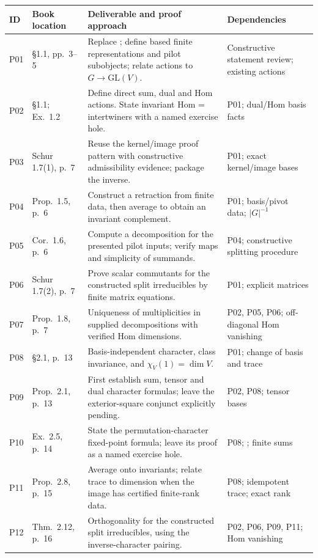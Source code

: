 \documentclass[11pt,a4paper]{article}
\newcommand{\code}[1]{\texttt{\detokenize{#1}}}
\begin{document}
{\small
\begin{tabularx}{\linewidth}{@{}P{10mm}P{31mm}YP{27mm}@{}}
\toprule
ID & Book location & Deliverable and proof approach & Dependencies \\
\midrule
P01 & \S1.1, pp.\ 3--5 & Replace \code{IsIrreducible}; define based finite representations and pilot subobjects; relate actions to $G\to\mathrm{GL}(V)$. & Constructive statement review; existing actions \\
P02 & \S1.1; Ex.\ 1.2 & Define direct sum, dual and Hom actions. State invariant Hom = intertwiners with a named exercise hole. & P01; dual/Hom basis facts \\
P03 & Schur 1.7(1), p.\ 7 & Reuse the kernel/image proof pattern with constructive admissibility evidence; package the inverse. & P01; exact kernel/image bases \\
P04 & Prop.\ 1.5, p.\ 6 & Construct a retraction from finite data, then average to obtain an invariant complement. & P01; basis/pivot data; $|G|^{-1}$ \\
P05 & Cor.\ 1.6, p.\ 6 & Compute a decomposition for the presented pilot inputs; verify maps and simplicity of summands. & P04; constructive splitting procedure \\
P06 & Schur 1.7(2), p.\ 7 & Prove scalar commutants for the constructed split irreducibles by finite matrix equations. & P01; explicit matrices \\
P07 & Prop.\ 1.8, p.\ 7 & Uniqueness of multiplicities in supplied decompositions with verified Hom dimensions. & P02, P05, P06; off-diagonal Hom vanishing \\
P08 & \S2.1, p.\ 13 & Basis-independent character, class invariance, and $\chi_V(1)=\dim V$. & P01; change of basis and trace \\
P09 & Prop.\ 2.1, p.\ 13 & First establish sum, tensor and dual character formulas; leave the exterior-square conjunct explicitly pending. & P02, P08; tensor bases \\
P10 & Ex.\ 2.5, p.\ 14 & State the permutation-character fixed-point formula; leave its proof as a named exercise hole. & P08; \code{PermRepr}; finite sums \\
P11 & Prop.\ 2.8, p.\ 15 & Average onto invariants; relate trace to dimension when the image has certified finite-rank data. & P08; idempotent trace; exact rank \\
P12 & Thm.\ 2.12, p.\ 16 & Orthogonality for the constructed split irreducibles, using the inverse-character pairing. & P02, P06, P09, P11; Hom vanishing \\
\bottomrule
\end{tabularx}}
\end{document}
